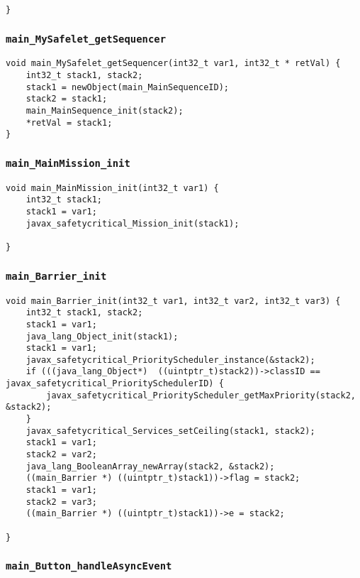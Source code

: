 \begin{landscape}
\begin{multicols}{2}
\begin{lstlisting}[firstnumber=1297]
}
\end{lstlisting}

\subsubsection{\texttt{main\_MySafelet\_getSequencer}}

\begin{lstlisting}[firstnumber=1551]
void main_MySafelet_getSequencer(int32_t var1, int32_t * retVal) {
	int32_t stack1, stack2;
	stack1 = newObject(main_MainSequenceID);
	stack2 = stack1;
	main_MainSequence_init(stack2);
	*retVal = stack1;
}
\end{lstlisting}

\subsubsection{\texttt{main\_MainMission\_init}}

\begin{lstlisting}[firstnumber=1666]
void main_MainMission_init(int32_t var1) {
	int32_t stack1;
	stack1 = var1;
	javax_safetycritical_Mission_init(stack1);

}
\end{lstlisting}

\subsubsection{\texttt{main\_Barrier\_init}}

\begin{lstlisting}[firstnumber=1728]
void main_Barrier_init(int32_t var1, int32_t var2, int32_t var3) {
	int32_t stack1, stack2;
	stack1 = var1;
	java_lang_Object_init(stack1);
	stack1 = var1;
	javax_safetycritical_PriorityScheduler_instance(&stack2);
	if (((java_lang_Object*)  ((uintptr_t)stack2))->classID == javax_safetycritical_PrioritySchedulerID) {
		javax_safetycritical_PriorityScheduler_getMaxPriority(stack2, &stack2);
	}
	javax_safetycritical_Services_setCeiling(stack1, stack2);
	stack1 = var1;
	stack2 = var2;
	java_lang_BooleanArray_newArray(stack2, &stack2);
	((main_Barrier *) ((uintptr_t)stack1))->flag = stack2;
	stack1 = var1;
	stack2 = var3;
	((main_Barrier *) ((uintptr_t)stack1))->e = stack2;

}
\end{lstlisting}

\subsubsection{\texttt{main\_Button\_handleAsyncEvent}}


\end{multicols}
\end{landscape}
